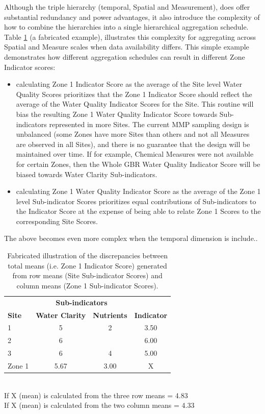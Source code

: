 Although the triple hierarchy (temporal, Spatial and Measurement), does offer
substantial redundancy and power advantages, it also introduce the
complexity of how to combine the hierarchies into a single hierarchical
aggregation schedule. Table \ref{tab:complexity} (a fabricated example),
illustrates this complexity for aggregating across Spatial and Measure
scales when data availability differs. This simple example demonstrates
how different aggregation schedules can result in different Zone Indicator scores:



\begin{itemize}
\itemsep1pt\parskip0pt
\item calculating Zone 1 Indicator Score as the average of the Site level Water Quality Scores
prioritizes that the Zone 1 Indicator Score should reflect the average of the Water Quality
Indicator Scores for the Site. This routine will bias the resulting Zone 1 Water Quality Indicator
Score towards Sub-indicators represented in more Sites.  The current MMP sampling design is
unbalanced (some Zones have more Sites than others and not all Measures are observed in all Sites),
and there is no guarantee that the design will be maintained over time. If for example, Chemical
Measures were not available for certain Zones, then the Whole GBR Water Quality Indicator Score will
be biased towards Water Clarity Sub-indicators.
\item calculating Zone 1 Water Quality Indicator Score as the average of the Zone 1 level
Sub-indicator Scores prioritizes equal contributions of Sub-indicators to the Indicator Score at the
expense of being able to relate Zone 1 Scores to the corresponding Site Scores.
\end{itemize}

The above becomes even more complex when the temporal dimension is include..

\begin{table}[htb]
\centering\scriptsize\scriptsize
\begin{minipage}{0.57\linewidth}
\caption{Fabricated illustration of the discrepancies between total means (i.e. Zone 1 Indicator Score) generated from row means (Site Sub-indicator Scores) and column means (Zone 1 Sub-indicator Scores).}\label{tab:complexity}
\scriptsize
\begin{tabular}{l|cc||c}
\toprule
&\multicolumn{2}{c}{\textbf{Sub-indicators}}&\\
\cmidrule(rl){2-3}
\textbf{Site}&\textbf{Water Clarity}&\textbf{Nutrients}&\textbf{Indicator}\\
\midrule
1&5&2&3.50\\
2&6&&6.00\\
3&6&4&5.00\\
\midrule
Zone 1&5.67&3.00&X\\
\bottomrule
\end{tabular}\\
If X (mean) is calculated from the three row means = 4.83\\
If X (mean) is calculated from the two column means = 4.33
\end{minipage}
\end{table}



